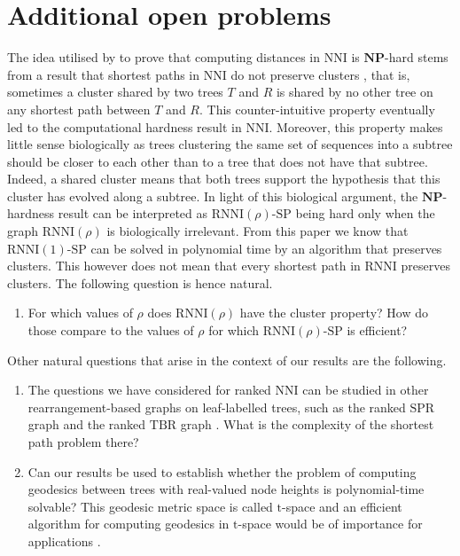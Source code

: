\documentclass[11pt]{amsart}
\newcommand{\rnni}{\mathrm{RNNI}}
\newcommand{\nni}{\mathrm{NNI}}
\newcommand{\spr}{\mathrm{SPR}}
\newcommand{\tbr}{\mathrm{TBR}}
\newcommand{\np}{\mathbf{NP}}
\newcommand{\decprob}[1]{\rnni(#1)\text{-}\mathrm{SP}}
\begin{document}
\section{Additional open problems}

The idea utilised by \textcite{Dasgupta2000-xa} to prove that computing distances in $\nni$ is $\np$-hard stems from a result that shortest paths in $\nni$ do not preserve clusters \autocite{Li1996-zw}, that is, sometimes a cluster shared by two trees $T$ and $R$ is shared by no other tree on any shortest path between $T$ and $R$.
This counter-intuitive property eventually led to the computational hardness result in $\nni$.
Moreover, this property makes little sense biologically as trees clustering the same set of sequences into a subtree should be closer to each other than to a tree that does not have that subtree.
Indeed, a shared cluster means that both trees support the hypothesis that this cluster has evolved along a subtree.
In light of this biological argument, the $\np$-hardness result can be interpreted as $\decprob{\rho}$ being hard only when the graph $\rnni(\rho)$ is biologically irrelevant.
From this paper we know that $\decprob{1}$ can be solved in polynomial time by an algorithm that preserves clusters.
This however does not mean that every shortest path in $\rnni$ preserves clusters.
The following question is hence natural.
\begin{enumerate}
\item For which values of $\rho$ does $\rnni(\rho)$ have the cluster property?
How do those compare to the values of $\rho$ for which $\decprob{\rho}$ is efficient?
\end{enumerate}
Other natural questions that arise in the context of our results are the following.
\begin{enumerate}
\addtocounter{enumi}{1}
\item The questions we have considered for ranked $\nni$ can be studied in other rearrangement-based graphs on leaf-labelled trees, such as the ranked $\spr$ graph and the ranked $\tbr$ graph \autocite{Semple2003-nj}.
What is the complexity of the shortest path problem there?

\item Can our results be used to establish whether the problem of computing geodesics between trees with real-valued node heights is polynomial-time solvable?
This geodesic metric space is called $\mathrm t$-space and an efficient algorithm for computing geodesics in $\mathrm t$-space would be of importance for applications \autocite{Gavryushkin2016-uu}.
\end{enumerate}

\printbibliography
\end{document}
